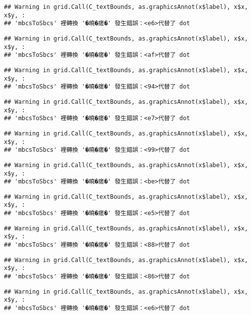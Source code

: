 \documentclass[
]{article}
\begin{document}
\begin{verbatim}
## Warning in grid.Call(C_textBounds, as.graphicsAnnot(x$label), x$x, x$y, :
## 'mbcsToSbcs' 裡轉換 '�曉�瘥�' 發生錯誤：<e6>代替了 dot
\end{verbatim}

\begin{verbatim}
## Warning in grid.Call(C_textBounds, as.graphicsAnnot(x$label), x$x, x$y, :
## 'mbcsToSbcs' 裡轉換 '�曉�瘥�' 發生錯誤：<af>代替了 dot
\end{verbatim}

\begin{verbatim}
## Warning in grid.Call(C_textBounds, as.graphicsAnnot(x$label), x$x, x$y, :
## 'mbcsToSbcs' 裡轉換 '�曉�瘥�' 發生錯誤：<94>代替了 dot
\end{verbatim}

\begin{verbatim}
## Warning in grid.Call(C_textBounds, as.graphicsAnnot(x$label), x$x, x$y, :
## 'mbcsToSbcs' 裡轉換 '�曉�瘥�' 發生錯誤：<e7>代替了 dot
\end{verbatim}

\begin{verbatim}
## Warning in grid.Call(C_textBounds, as.graphicsAnnot(x$label), x$x, x$y, :
## 'mbcsToSbcs' 裡轉換 '�曉�瘥�' 發生錯誤：<99>代替了 dot
\end{verbatim}

\begin{verbatim}
## Warning in grid.Call(C_textBounds, as.graphicsAnnot(x$label), x$x, x$y, :
## 'mbcsToSbcs' 裡轉換 '�曉�瘥�' 發生錯誤：<be>代替了 dot
\end{verbatim}

\begin{verbatim}
## Warning in grid.Call(C_textBounds, as.graphicsAnnot(x$label), x$x, x$y, :
## 'mbcsToSbcs' 裡轉換 '�曉�瘥�' 發生錯誤：<e5>代替了 dot
\end{verbatim}

\begin{verbatim}
## Warning in grid.Call(C_textBounds, as.graphicsAnnot(x$label), x$x, x$y, :
## 'mbcsToSbcs' 裡轉換 '�曉�瘥�' 發生錯誤：<88>代替了 dot
\end{verbatim}

\begin{verbatim}
## Warning in grid.Call(C_textBounds, as.graphicsAnnot(x$label), x$x, x$y, :
## 'mbcsToSbcs' 裡轉換 '�曉�瘥�' 發生錯誤：<86>代替了 dot
\end{verbatim}

\begin{verbatim}
## Warning in grid.Call(C_textBounds, as.graphicsAnnot(x$label), x$x, x$y, :
## 'mbcsToSbcs' 裡轉換 '�曉�瘥�' 發生錯誤：<e6>代替了 dot
\end{verbatim}
\end{document}
